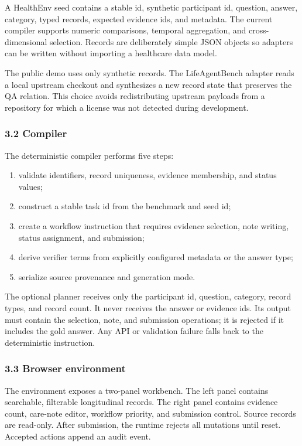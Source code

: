 \documentclass[
]{article}
\providecommand{\tightlist}{%
  \setlength{\itemsep}{0pt}\setlength{\parskip}{0pt}}
\begin{document}
A HealthEnv seed contains a stable id, synthetic participant id,
question, answer, category, typed records, expected evidence ids, and
metadata. The current compiler supports numeric comparisons, temporal
aggregation, and cross-dimensional selection. Records are deliberately
simple JSON objects so adapters can be written without importing a
healthcare data model.

The public demo uses only synthetic records. The LifeAgentBench adapter
reads a local upstream checkout and synthesizes a new record state that
preserves the QA relation. This choice avoids redistributing upstream
payloads from a repository for which a license was not detected during
development.

\subsubsection{3.2 Compiler}\label{compiler}

The deterministic compiler performs five steps:

\begin{enumerate}
\def\labelenumi{\arabic{enumi}.}
\tightlist
\item
  validate identifiers, record uniqueness, evidence membership, and
  status values;
\item
  construct a stable task id from the benchmark and seed id;
\item
  create a workflow instruction that requires evidence selection, note
  writing, status assignment, and submission;
\item
  derive verifier terms from explicitly configured metadata or the
  answer type;
\item
  serialize source provenance and generation mode.
\end{enumerate}

The optional planner receives only the participant id, question,
category, record types, and record count. It never receives the answer
or evidence ids. Its output must contain the selection, note, and
submission operations; it is rejected if it includes the gold answer.
Any API or validation failure falls back to the deterministic
instruction.

\subsubsection{3.3 Browser environment}\label{browser-environment}

The environment exposes a two-panel workbench. The left panel contains
searchable, filterable longitudinal records. The right panel contains
evidence count, care-note editor, workflow priority, and submission
control. Source records are read-only. After submission, the runtime
rejects all mutations until reset. Accepted actions append an audit
event.
\end{document}
